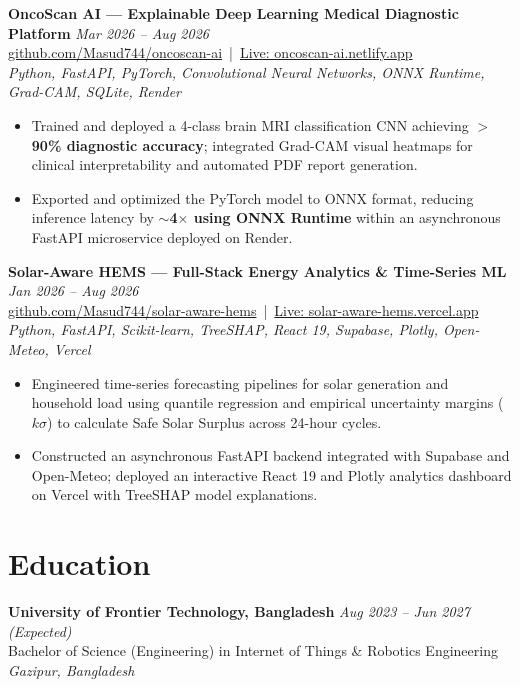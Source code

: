 \documentclass[10pt,a4paper]{article}
\begin{document}
\textbf{OncoScan AI --- Explainable Deep Learning Medical Diagnostic Platform} \hfill \textit{Mar 2026 -- Aug 2026} \\
\href{https://github.com/Masud744/oncoscan-ai}{github.com/Masud744/oncoscan-ai} \,|\, \href{https://oncoscan-ai.netlify.app/}{Live: oncoscan-ai.netlify.app} \\
\textit{Python, FastAPI, PyTorch, Convolutional Neural Networks, ONNX Runtime, Grad-CAM, SQLite, Render}
\begin{itemize}
    \item Trained and deployed a 4-class brain MRI classification CNN achieving \textbf{$>$90\% diagnostic accuracy}; integrated Grad-CAM visual heatmaps for clinical interpretability and automated PDF report generation.
    \item Exported and optimized the PyTorch model to ONNX format, reducing inference latency by \textbf{$\sim$4$\times$ using ONNX Runtime} within an asynchronous FastAPI microservice deployed on Render.
\end{itemize}

\textbf{Solar-Aware HEMS --- Full-Stack Energy Analytics \& Time-Series ML} \hfill \textit{Jan 2026 -- Aug 2026} \\
\href{https://github.com/Masud744/solar-aware-hems}{github.com/Masud744/solar-aware-hems} \,|\, \href{https://solar-aware-hems.vercel.app}{Live: solar-aware-hems.vercel.app} \\
\textit{Python, FastAPI, Scikit-learn, TreeSHAP, React 19, Supabase, Plotly, Open-Meteo, Vercel}
\begin{itemize}
    \item Engineered time-series forecasting pipelines for solar generation and household load using quantile regression and empirical uncertainty margins ($k\sigma$) to calculate Safe Solar Surplus across 24-hour cycles.
    \item Constructed an asynchronous FastAPI backend integrated with Supabase and Open-Meteo; deployed an interactive React 19 and Plotly analytics dashboard on Vercel with TreeSHAP model explanations.
\end{itemize}

\section*{Education}

\textbf{University of Frontier Technology, Bangladesh} \hfill \textit{Aug 2023 -- Jun 2027 (Expected)} \\
Bachelor of Science (Engineering) in Internet of Things \& Robotics Engineering \hfill \textit{Gazipur, Bangladesh}
\end{document}
